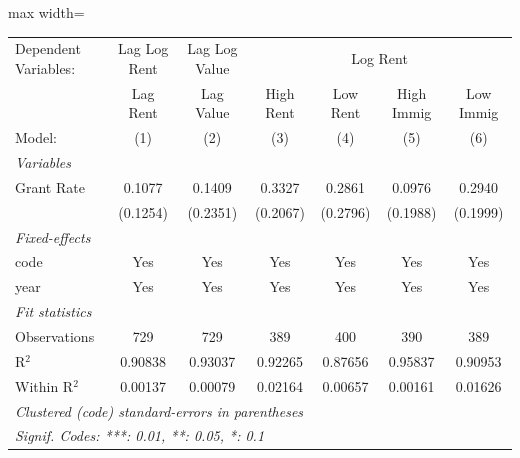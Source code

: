 
\begingroup
\centering
\begin{adjustbox}{max width=\textwidth}
\begin{tabular}{lcccccc}
   \tabularnewline \midrule \midrule
   Dependent Variables: & Lag Log Rent & Lag Log Value & \multicolumn{4}{c}{Log Rent}\\
                & Lag Rent & Lag Value & High Rent & Low Rent & High Immig & Low Immig \\   
   Model:       & (1)      & (2)       & (3)       & (4)      & (5)        & (6)\\  
   \midrule
   \emph{Variables}\\
   Grant Rate   & 0.1077   & 0.1409    & 0.3327    & 0.2861   & 0.0976     & 0.2940\\   
                & (0.1254) & (0.2351)  & (0.2067)  & (0.2796) & (0.1988)   & (0.1999)\\   
   \midrule
   \emph{Fixed-effects}\\
   code         & Yes      & Yes       & Yes       & Yes      & Yes        & Yes\\  
   year         & Yes      & Yes       & Yes       & Yes      & Yes        & Yes\\  
   \midrule
   \emph{Fit statistics}\\
   Observations & 729      & 729       & 389       & 400      & 390        & 389\\  
   R$^2$        & 0.90838  & 0.93037   & 0.92265   & 0.87656  & 0.95837    & 0.90953\\  
   Within R$^2$ & 0.00137  & 0.00079   & 0.02164   & 0.00657  & 0.00161    & 0.01626\\  
   \midrule \midrule
   \multicolumn{7}{l}{\emph{Clustered (code) standard-errors in parentheses}}\\
   \multicolumn{7}{l}{\emph{Signif. Codes: ***: 0.01, **: 0.05, *: 0.1}}\\
\end{tabular}
\end{adjustbox}
\par\endgroup


